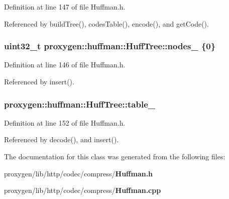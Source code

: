 Definition at line 147 of file Huffman.\+h.



Referenced by build\+Tree(), codes\+Table(), encode(), and get\+Code().

\subsubsection[{nodes\+\_\+}]{\setlength{\rightskip}{0pt plus 5cm}uint32\+\_\+t proxygen\+::huffman\+::\+Huff\+Tree\+::nodes\+\_\+ \{0\}\hspace{0.3cm}{\ttfamily [private]}}\label{classproxygen_1_1huffman_1_1HuffTree_a3faa7b416d05787133a5df5bf23bc758}


Definition at line 146 of file Huffman.\+h.



Referenced by insert().

\subsubsection[{table\+\_\+}]{ proxygen\+::huffman\+::\+Huff\+Tree\+::table\+\_\+[46]\hspace{0.3cm}{\ttfamily [protected]}}\label{classproxygen_1_1huffman_1_1HuffTree_a5d6350d6a6af123c10585029d4bf98e3}


Definition at line 152 of file Huffman.\+h.



Referenced by decode(), and insert().



The documentation for this class was generated from the following files\+:\begin{DoxyCompactItemize}
\item 
proxygen/lib/http/codec/compress/{\bf Huffman.\+h}\item 
proxygen/lib/http/codec/compress/{\bf Huffman.\+cpp}\end{DoxyCompactItemize}

